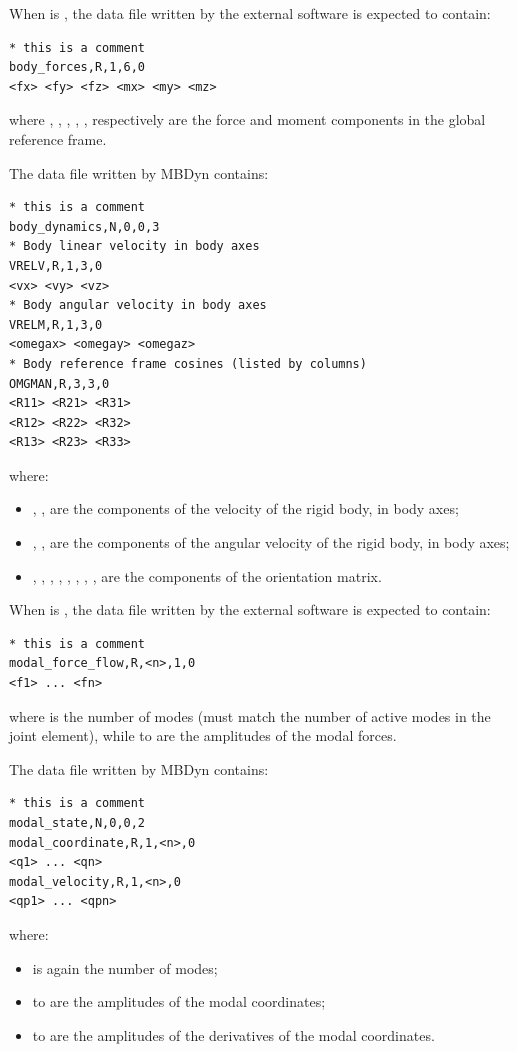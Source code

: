 When  is , the data file written by the external software
is expected to contain:
\begin{verbatim}
* this is a comment
body_forces,R,1,6,0
<fx> <fy> <fz> <mx> <my> <mz>
\end{verbatim}
where , , , , , 
respectively are the force and moment components
in the global reference frame.

The data file written by MBDyn contains:
\begin{verbatim}
* this is a comment
body_dynamics,N,0,0,3
* Body linear velocity in body axes
VRELV,R,1,3,0
<vx> <vy> <vz>
* Body angular velocity in body axes
VRELM,R,1,3,0
<omegax> <omegay> <omegaz>
* Body reference frame cosines (listed by columns)
OMGMAN,R,3,3,0
<R11> <R21> <R31>
<R12> <R22> <R32>
<R13> <R23> <R33>
\end{verbatim}
where:
\begin{itemize}
\item {}, ,  are the components of the velocity
	of the rigid body, in body axes;
\item {}, ,  are the components
	of the angular velocity of the rigid body, in body axes;
\item {}, , , , , ,
	, ,  are the components
	of the orientation matrix.
\end{itemize}

When  is , the data file written by the external software
is expected to contain:
\begin{verbatim}
* this is a comment
modal_force_flow,R,<n>,1,0
<f1> ... <fn>
\end{verbatim}
where  is the number of modes (must match the number of active modes
in the  joint element), while  to  are the amplitudes
of the modal forces.

The data file written by MBDyn contains:
\begin{verbatim}
* this is a comment
modal_state,N,0,0,2
modal_coordinate,R,1,<n>,0
<q1> ... <qn>
modal_velocity,R,1,<n>,0
<qp1> ... <qpn>
\end{verbatim}
where:
\begin{itemize}
\item {} is again the number of modes;
\item {} to  are the amplitudes of the modal coordinates;
\item {} to  are the amplitudes of the derivatives
	of the modal coordinates.
\end{itemize}

